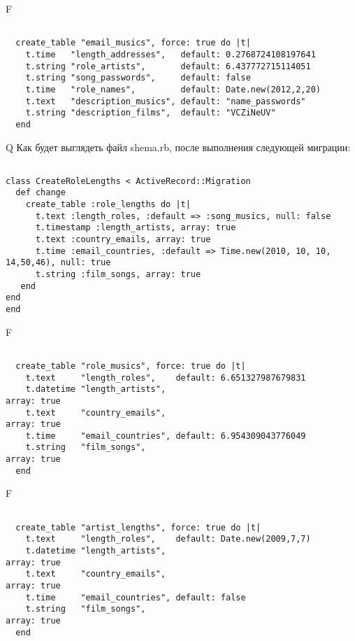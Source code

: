 F
\begin{verbatim}

  create_table "email_musics", force: true do |t|
    t.time   "length_addresses",   default: 0.2768724108197641
    t.string "role_artists",       default: 6.437772715114051
    t.string "song_passwords",     default: false
    t.time   "role_names",         default: Date.new(2012,2,20)
    t.text   "description_musics", default: "name_passwords"
    t.string "description_films",  default: "VCZiNeUV"
  end

\end{verbatim}

Q
Как будет выглядеть файл shema.rb, после выполнения следующей миграции:

\begin{verbatim}

class CreateRoleLengths < ActiveRecord::Migration 
  def change 
    create_table :role_lengths do |t| 
      t.text :length_roles, :default => :song_musics, null: false
      t.timestamp :length_artists, array: true
      t.text :country_emails, array: true
      t.time :email_countries, :default => Time.new(2010, 10, 10, 14,50,46), null: true
      t.string :film_songs, array: true
   end
end
end
\end{verbatim}

F
\begin{verbatim}

  create_table "role_musics", force: true do |t|
    t.text     "length_roles",    default: 6.651327987679831
    t.datetime "length_artists",                                               array: true
    t.text     "country_emails",                                               array: true
    t.time     "email_countries", default: 6.954309043776049
    t.string   "film_songs",                                                   array: true
  end

\end{verbatim}

F
\begin{verbatim}

  create_table "artist_lengths", force: true do |t|
    t.text     "length_roles",    default: Date.new(2009,7,7)
    t.datetime "length_artists",                                               array: true
    t.text     "country_emails",                                               array: true
    t.time     "email_countries", default: false
    t.string   "film_songs",                                                   array: true
  end

\end{verbatim}

